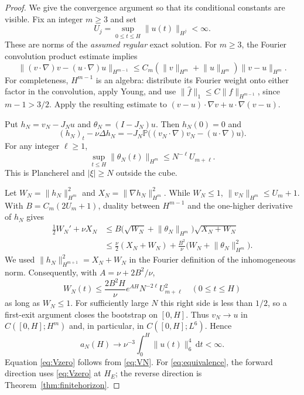\documentclass[11pt,a4paper]{article}
\theoremstyle{definition}\newtheorem{definition}[theorem]{Definition}
\theoremstyle{remark}\newtheorem{remark}[theorem]{Remark}
\newcommand{\PP}{\mathbb P}
\newcommand{\dd}{\,\mathrm d}
\newcommand{\norm}[1]{\lVert #1\rVert}
\numberwithin{equation}{section}
\begin{document}
\begin{proof}
We give the convergence argument so that its conditional constants are visible. Fix an integer $m\ge3$ and set
\[
 U_j=\sup_{0\le t\le H}\norm{u(t)}_{H^j}<\infty.
\]
These are norms of the \emph{assumed regular} exact solution. For $m\ge3$, the Fourier convolution product estimate implies
\begin{equation}\label{eq:product}
 \norm{(v\cdot\nabla)v-(u\cdot\nabla)u}_{H^{m-1}}
 \le C_m(\norm v_{H^m}+\norm u_{H^m})\norm{v-u}_{H^m}.
\end{equation}
For completeness, $H^{m-1}$ is an algebra: distribute its Fourier weight onto either factor in the convolution, apply Young, and use $\norm{\widehat f}_1\le C\norm f_{H^{m-1}}$, since $m-1>3/2$. Apply the resulting estimate to $(v-u)\cdot\nabla v+u\cdot\nabla(v-u)$.

Put $h_N=v_N-J_Nu$ and $\theta_N=(I-J_N)u$. Then $h_N(0)=0$ and
\[
 (h_N)_t-\nu\Delta h_N
 =-J_N\PP\bigl((v_N\cdot\nabla)v_N-(u\cdot\nabla)u\bigr).
\]
For any integer $\ell\ge1$,
\begin{equation}\label{eq:tailHm}
 \sup_{t\le H}\norm{\theta_N(t)}_{H^m}\le N^{-\ell}U_{m+\ell}.
\end{equation}
This is Plancherel and $|\xi|\ge N$ outside the cube.

Let $W_N=\norm{h_N}_{H^m}^2$ and $X_N=\norm{\nabla h_N}_{H^m}^2$. While $W_N\le1$, $\norm{v_N}_{H^m}\le U_m+1$. With $B=C_m(2U_m+1)$, duality between $H^{m-1}$ and the one-higher derivative of $h_N$ gives
\begin{align*}
 \tfrac12 W_N'+\nu X_N
 &\le B\bigl(\sqrt{W_N}+\norm{\theta_N}_{H^m}\bigr)\sqrt{X_N+W_N}\\
 &\le\tfrac\nu2(X_N+W_N)
       +\frac{B^2}{\nu}\bigl(W_N+\norm{\theta_N}_{H^m}^2\bigr).
\end{align*}
We used $\norm{h_N}_{H^{m+1}}^2=X_N+W_N$ in the Fourier definition of the inhomogeneous norm. Consequently, with $A=\nu+2B^2/\nu$,
\begin{equation}\label{eq:conditionalconvergence}
 W_N(t)\le\frac{2B^2H}{\nu}e^{AH}N^{-2\ell}U_{m+\ell}^2
 \quad(0\le t\le H)
\end{equation}
as long as $W_N\le1$. For sufficiently large $N$ this right side is less than $1/2$, so a first-exit argument closes the bootstrap on $[0,H]$. Thus $v_N\to u$ in $C([0,H];H^m)$ and, in particular, in $C([0,H];L^6)$. Hence
\[
 a_N(H)\longrightarrow\nu^{-3}\int_0^H\norm{u(t)}_6^4\dd t<\infty.
\]
Equation \eqref{eq:Vzero} follows from \eqref{eq:VN}. For \eqref{eq:equivalence}, the forward direction uses \eqref{eq:Vzero} at $H_E$; the reverse direction is Theorem~\ref{thm:finitehorizon}.
\end{proof}
\end{document}
